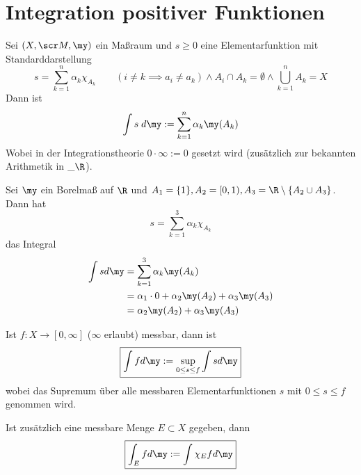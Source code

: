 \documentclass[a4paper,10pt]{scrbook}
\begin{document}
\section{Integration positiver Funktionen}

\begin{df*}
	Sei $(X,\scr M, \my)$ ein Maßraum und $s\ge 0$ eine Elementarfunktion mit Standarddarstellung
	\[
		s=\sum_{k=1}^n \alpha_k \chi_{A_k} \qquad (i\neq k \implies a_i\neq a_k) \land A_i\cap A_k =\emptyset \land \bigcup_{k=1}^nA_k = X
	\]
	Dann ist
	\[
		\int s\;d\my := \sum_{k=1}^n \alpha_k \my(A_k)
	\]
	Wobei in der Integrationstheorie $0\cdot \infty := 0$ gesetzt wird (zusätzlich zur bekannten Arithmetik in $\_\R$).
\end{df*}


\begin{ex*}
	Sei $\my$ ein Borelmaß auf $\R$ und $A_1 = \{1\}, A_2 = [0,1), A_3 = \R\setminus \{A_2\cup A_3\}$.
	Dann hat
	\[
		s= \sum_{k=1}^3 \alpha_k \chi_{A_k}
	\]
	das Integral
	\begin{align*}
		\int s d\my &= \sum_{k=1}^3 \alpha_k \my(A_k)\\
											   &= \alpha_1\cdot 0  + \alpha_2 \my(A_2) + \alpha_3 \my(A_3)\\
										 &= \alpha_2\my(A_2) + \alpha_3 \my(A_3)
	\end{align*}
\end{ex*}

\begin{df*}
	Ist $f:X\to [0,\infty]$ ($\infty$ erlaubt) messbar, dann ist
	\[\boxed{
		\int f d\my := \sup_{0\le s\le f} \int s d\my
	}\]
	wobei das Supremum über alle messbaren Elementarfunktionen $s$ mit $0\le s\le f$ genommen wird.

	Ist zusätzlich eine messbare Menge $E\subset X$ gegeben, dann
	\[\boxed{
		\int_E f d\my := \int \chi_E f d\my
	}\]
\end{df*}
\end{document}
